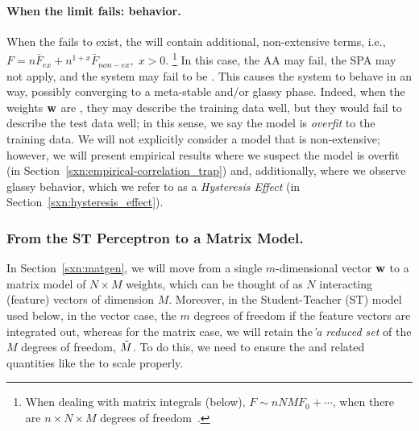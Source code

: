 \paragraph{When the \Thermodynamic limit fails: \ATypical behavior.}
When the \ThermodynamicLimit fails to exist, the \FreeEnergy will contain additional, non-extensive terms, i.e.,
$F = n\bar{F}_{ex} + n^{1+x}\bar{F}_{non-ex},\;x>0$.
\footnote{When dealing with matrix integrals (below), $F\sim nNMF_{0}+\cdots$, when there are $n \times N \times M$ degrees
of freedom~\cite{PP95}.}
In this case, the AA may fail, the SPA may not apply, and the system may fail to be \SelfAveraging.
This causes the system to behave in an \ATypical way, 
possibly converging to a meta-stable and/or glassy phase.
Indeed, when the weights ${\mathbf{w}}$ are \emph{\ATypical}, they may describe the training data well, 
but they would fail to describe the test data well; in this sense, we say the model is \emph{overfit} to the training data.
We will not explicitly consider a model that is non-extensive; however, we will
present empirical results where we suspect the model is overfit
(in Section~\ref{sxn:empirical-correlation_trap})
and, additionally, where we observe glassy behavior, which we refer to as a \emph{Hysteresis Effect}
(in Section~\ref{sxn:hysteresis_effect}).


\subsubsection{From the ST Perceptron to a Matrix Model.} 
\label{sxn:from_vectors}
In Section~\ref{sxn:matgen}, we will move from a single $m$-dimensional \Perceptron vector ${\mathbf{w}}$ 
to a matrix model of $N \times M$ weights, which can be thought of
as $N$ interacting (feature) vectors of dimension $M$.
Moreover, in the Student-Teacher (ST) model used below,
in the vector case, the $m$ degrees of freedom if the feature vectors are integrated out,
whereas for the matrix case, we will retain the\emph{'a reduced set} of the  $M$ degrees of freedom, $\tilde{M}$.  To do this, we need to ensure the \FreeEnergies and related quantities like the \LayerQualitySquared to scale properly.


